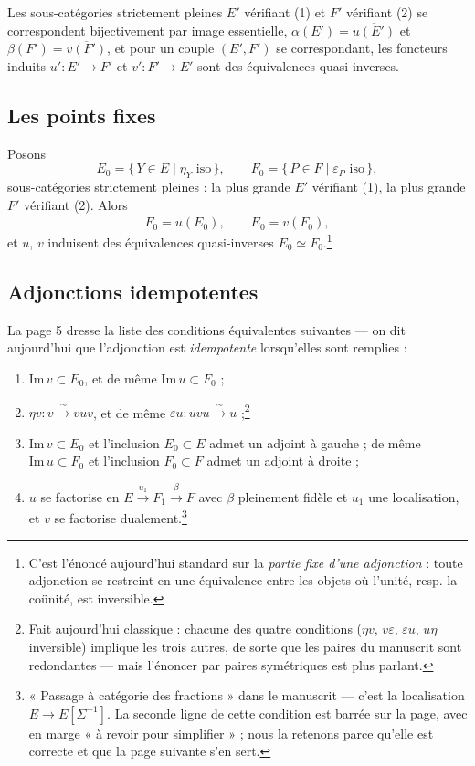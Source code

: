 \documentclass[11pt,a4paper]{article}
\begin{document}
Les sous-catégories strictement pleines $E'$ vérifiant (1) et $F'$
vérifiant (2) se correspondent bijectivement par image essentielle,
$\alpha(E') = \overline{u(E')}$ et $\beta(F') = \overline{v(F')}$, et pour
un couple $(E', F')$ se correspondant, les foncteurs induits
$u' : E' \to F'$ et $v' : F' \to E'$ sont des équivalences quasi-inverses.

\subsection*{Les points fixes}

Posons
\[
E_0 = \{\, Y \in E \mid \eta_Y \text{ iso} \,\}, \qquad
F_0 = \{\, P \in F \mid \varepsilon_P \text{ iso} \,\},
\]
sous-catégories strictement pleines : la plus grande $E'$ vérifiant (1), la
plus grande $F'$ vérifiant (2). Alors
\[
F_0 = \overline{u(E_0)}, \qquad E_0 = \overline{v(F_0)},
\]
et $u$, $v$ induisent des équivalences quasi-inverses
$E_0 \simeq F_0$.\footnote{C'est l'énoncé aujourd'hui standard sur la
\emph{partie fixe d'une adjonction} : toute adjonction se restreint en une
équivalence entre les objets où l'unité, resp. la coünité, est inversible.}

\subsection*{Adjonctions idempotentes}

La page 5 dresse la liste des conditions équivalentes suivantes — on
dit aujourd'hui que l'adjonction est \emph{idempotente} lorsqu'elles sont
remplies :

\begin{enumerate}
\item $\mathrm{Im}\, v \subset E_0$, et de même $\mathrm{Im}\, u \subset F_0$ ;
\item $\eta v : v \xrightarrow{\ \sim\ } vuv$, et de même
$\varepsilon u : uvu \xrightarrow{\ \sim\ } u$ ;\footnote{Fait aujourd'hui
classique : chacune des quatre conditions ($\eta v$, $v\varepsilon$,
$\varepsilon u$, $u\eta$ inversible) implique les trois autres, de sorte
que les paires du manuscrit sont redondantes — mais l'énoncer par paires
symétriques est plus parlant.}
\item $\mathrm{Im}\, v \subset E_0$ et l'inclusion $E_0 \subset E$ admet un
adjoint à gauche ; de même $\mathrm{Im}\, u \subset F_0$ et l'inclusion
$F_0 \subset F$ admet un adjoint à droite ;
\item $u$ se factorise en $E \xrightarrow{u_1} F_1 \xrightarrow{\beta} F$
avec $\beta$ pleinement fidèle et $u_1$ une localisation, et $v$ se
factorise dualement.\footnote{« Passage à catégorie des fractions » dans le
manuscrit — c'est la localisation $E \to E[\Sigma^{-1}]$. La seconde ligne
de cette condition est barrée sur la page, avec en marge « à revoir
pour simplifier » ; nous la retenons parce qu'elle est correcte et que la page suivante s'en sert.}
\end{enumerate}
\end{document}
